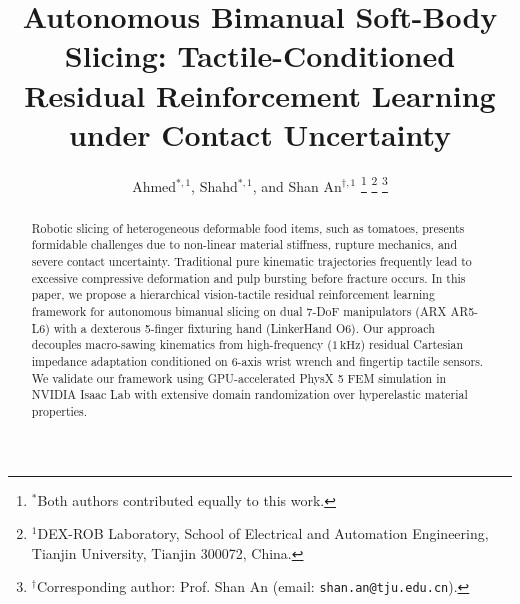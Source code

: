 \documentclass[letterpaper, 10 pt, conference]{IEEEtran}
\title{\LARGE \bf
Autonomous Bimanual Soft-Body Slicing: Tactile-Conditioned Residual Reinforcement Learning under Contact Uncertainty
}
\author{Ahmed$^{*,1}$, Shahd$^{*,1}$, and Shan An$^{\dagger,1}$%
\thanks{$^{*}$Both authors contributed equally to this work.}%
\thanks{$^{1}$DEX-ROB Laboratory, School of Electrical and Automation Engineering, Tianjin University, Tianjin 300072, China.}%
\thanks{$^{\dagger}$Corresponding author: Prof. Shan An (email: {\tt shan.an@tju.edu.cn}).}%
}
\begin{document}
\maketitle
\thispagestyle{empty}
\pagestyle{empty}

\begin{abstract}
Robotic slicing of heterogeneous deformable food items, such as tomatoes, presents formidable challenges due to non-linear material stiffness, rupture mechanics, and severe contact uncertainty. Traditional pure kinematic trajectories frequently lead to excessive compressive deformation and pulp bursting before fracture occurs. In this paper, we propose a hierarchical vision-tactile residual reinforcement learning framework for autonomous bimanual slicing on dual 7-DoF manipulators (ARX AR5-L6) with a dexterous 5-finger fixturing hand (LinkerHand O6). Our approach decouples macro-sawing kinematics from high-frequency ($1\,\text{kHz}$) residual Cartesian impedance adaptation conditioned on 6-axis wrist wrench and fingertip tactile sensors. We validate our framework using GPU-accelerated PhysX 5 FEM simulation in NVIDIA Isaac Lab with extensive domain randomization over hyperelastic material properties. 
\end{abstract}











\end{document}
